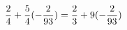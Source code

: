 \documentclass[preview]{standalone}
\begin{document}
\begin{align*}
\special{dvisvgm:raw <g id='unique000'>}\frac{2}{4} + \frac{5}{4} (- \frac{2}{93}) = \frac{2}{3} + 9(- \frac{2}{93})\special{dvisvgm:raw </g>}
\end{align*}
\end{document}
